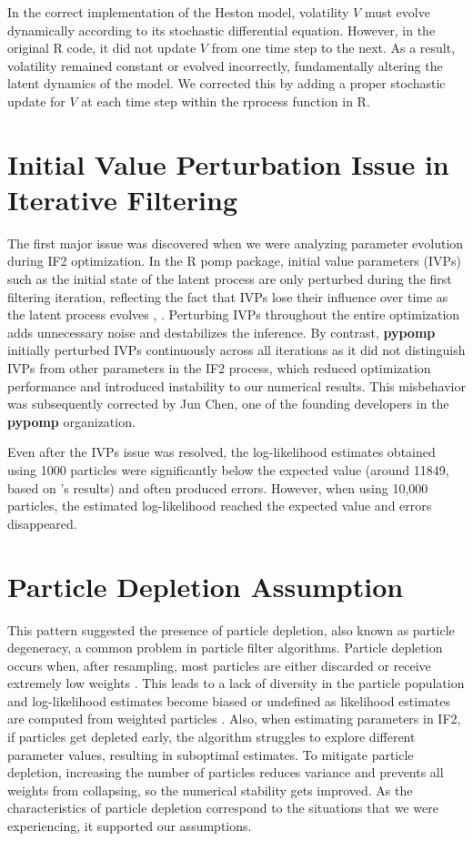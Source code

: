 \documentclass[11pt]{report}
\begin{document}
In the correct implementation of the Heston model, volatility $V$ must evolve dynamically according to its stochastic differential equation. However, in the original R code, it did not update $V$ from one time step to the next. As a result, volatility remained constant or evolved incorrectly, fundamentally altering the latent dynamics of the model. We corrected this by adding a proper stochastic update for $V$ at each time step within the rprocess function in R. 

\section{Initial Value Perturbation Issue in Iterative Filtering}
The first major issue was discovered when we were analyzing parameter evolution during IF2 optimization. In the R pomp package, initial value parameters (IVPs) such as the initial state of the latent process are only perturbed during the first filtering iteration, reflecting the fact that IVPs lose their influence over time as the latent process evolves \citep{ionides2015inference}, \citep{king2016statistical}. Perturbing IVPs throughout the entire optimization adds unnecessary noise and destabilizes the inference. By contrast, \textbf{pypomp} initially perturbed IVPs continuously across all iterations as it did not distinguish IVPs from other parameters in the IF2 process, which reduced optimization performance and introduced instability to our numerical results. This misbehavior was subsequently corrected by Jun Chen, one of the founding developers in the \textbf{pypomp} organization. 


Even after the IVPs issue was resolved, the log-likelihood estimates obtained using 1000 particles were significantly below the expected value (around 11849, based on \citet{sunmodel}’s results) and often produced errors. However, when using 10,000 particles, the estimated log-likelihood reached the expected value and errors disappeared.

\section{Particle Depletion Assumption}
This pattern suggested the presence of particle depletion, also known as particle degeneracy, a common problem in particle filter algorithms. Particle depletion occurs when, after resampling, most particles are either discarded or receive extremely low weights \citep{daum2011particle}. This leads to a lack of diversity in the particle population and log-likelihood estimates become biased or undefined as likelihood estimates are computed from weighted particles \citep{gustafsson2002particle}. Also, when estimating parameters in IF2, if particles get depleted early, the algorithm struggles to explore different parameter values, resulting in suboptimal estimates. To mitigate particle depletion, increasing the number of particles reduces variance and prevents all weights from collapsing, so the numerical stability gets improved. As the characteristics of particle depletion correspond to the situations that we were experiencing, it supported our assumptions.
\end{document}

